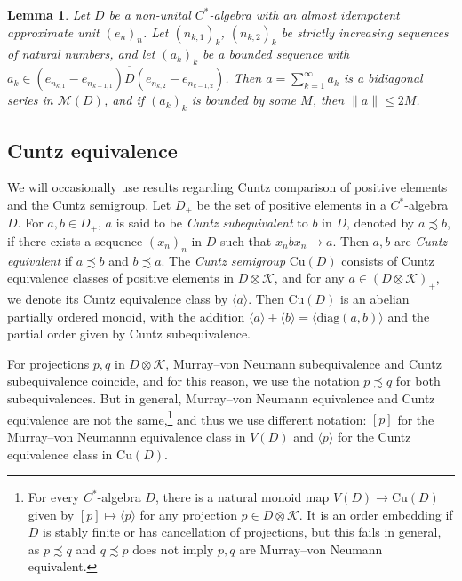 \documentclass[reqno]{amsart}
\newtheorem{lem}[thm]{Lemma}
\theoremstyle{definition}
\theoremstyle{remark}
\numberwithin{equation}{section}
\theoremstyle{definition}
\newcommand{\calM}{\mathcal{M}}
\newcommand{\calK}{\mathcal{K}}
\begin{document}
\begin{lem} \label{almost_ortho_approx}
Let $D$ be a non-unital $C^*$-algebra with an almost idempotent approximate unit $(e_{n})_{n}$. Let $(n_{k,1})_{k}$, $(n_{k,2})_{k}$ be strictly increasing sequences of natural numbers, and let $(a_{k})_{k}$ be a bounded sequence with $a_{k}\in \overline{(e_{n_{k, 1}} - e_{n_{k-1, 1}})D(e_{n_{k, 2}} - e_{n_{k-1, 2}})}$. Then $a = \sum_{k=1}^{\infty}a_{k}$ is a bidiagonal series in $\calM(D)$, and if $(a_{k})_{k}$ is bounded by some $M$, then $\|a\|\leq  2M$. 
\end{lem} 

\subsection{Cuntz equivalence} 
We will occasionally use results regarding Cuntz comparison of positive elements and the Cuntz semigroup. Let $D_{+}$ be the set of positive elements in a $C^*$-algebra $D$. For $a, b\in D_{+}$, $a$ is said to be \emph{Cuntz subequivalent} to $b$ in $D$, denoted by $a\precsim b$, if there exists a sequence $(x_{n})_{n}$ in $D$ such that $x_{n}bx_{n}\rightarrow a$. Then $a, b$ are \emph{Cuntz equivalent} if $a\precsim b$ and $b\precsim a$.  The \emph{Cuntz semigroup} $\mathrm{Cu}(D)$ consists of Cuntz equivalence classes of positive elements in $D\otimes \calK$, and for any $a\in (D\otimes \calK)_{+}$, we denote its Cuntz equivalence class by $\langle a \rangle$. Then $\mathrm{Cu}(D)$ is an abelian partially ordered monoid, with the addition $\langle a \rangle + \langle b \rangle = \langle \mathrm{diag}(a, b)\rangle$ and the partial order given by Cuntz subequivalence. 

For projections $p, q$ in $D\otimes \calK$, Murray--von Neumann subequivalence and Cuntz subequivalence coincide, and for this reason, we use the notation $p\precsim q$ for both subequivalences. But in general, Murray--von Neumann equivalence and Cuntz equivalence are not the same,\footnote{For every $C^*$-algebra $D$, there is a natural monoid map $V(D)\rightarrow \mathrm{Cu}(D)$ given by $[p]\mapsto \langle p\rangle$ for any projection $p\in D\otimes \calK$. It is an order embedding if $D$ is stably finite or has cancellation of projections, but this fails in general, as $p\precsim q$ and $q\precsim p$ does not imply $p,q$ are Murray--von Neumann equivalent.} and thus we use different notation: $[p]$ for the Murray--von Neumannn equivalence class in $V(D)$ and $\langle p\rangle$ for the Cuntz equivalence class in $\mathrm{Cu}(D)$. 
\end{document}
